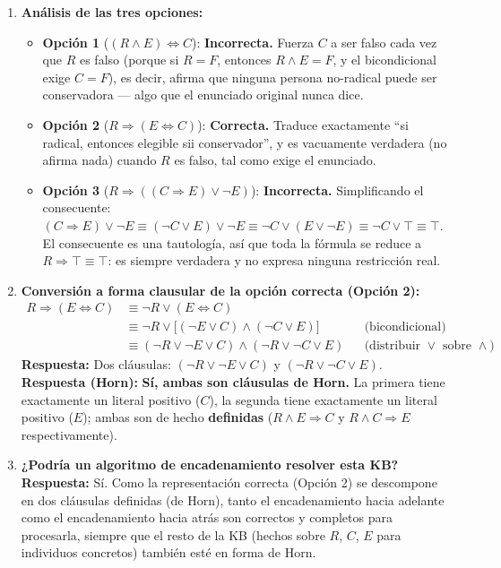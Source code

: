 \begin{enumerate}
    \item \textbf{Análisis de las tres opciones:}
    \begin{itemize}
        \item \textbf{Opción 1} ($(R\land E)\Leftrightarrow C$): \textbf{Incorrecta.} Fuerza
        $C$ a ser falso cada vez que $R$ es falso (porque si $R{=}F$, entonces $R\land E = F$, y el
        bicondicional exige $C=F$), es decir, afirma que ninguna persona no-radical puede ser
        conservadora — algo que el enunciado original nunca dice.
        \item \textbf{Opción 2} ($R\Rightarrow(E\Leftrightarrow C)$): \textbf{Correcta.} Traduce
        exactamente ``si radical, entonces elegible sii conservador'', y es vacuamente verdadera
        (no afirma nada) cuando $R$ es falso, tal como exige el enunciado.
        \item \textbf{Opción 3} ($R\Rightarrow((C\Rightarrow E)\lor \neg E)$): \textbf{Incorrecta.}
        Simplificando el consecuente: $(C\Rightarrow E)\lor\neg E \equiv (\neg C \lor E)\lor \neg E
        \equiv \neg C \lor (E \lor \neg E) \equiv \neg C \lor \top \equiv \top$. El consecuente es
        una tautología, así que toda la fórmula se reduce a $R\Rightarrow\top \equiv \top$: es
        siempre verdadera y no expresa ninguna restricción real.
    \end{itemize}

    \item \textbf{Conversión a forma clausular de la opción correcta (Opción 2):}
    \begin{align*}
        R\Rightarrow(E\Leftrightarrow C) &\equiv \neg R \lor (E\Leftrightarrow C) \\
        &\equiv \neg R \lor \big[(\neg E\lor C)\land(\neg C\lor E)\big] &&\text{(bicondicional)}\\
        &\equiv (\neg R\lor\neg E\lor C) \land (\neg R\lor\neg C\lor E) &&\text{(distribuir }\lor\text{ sobre }\land\text{)}
    \end{align*}
    \textbf{Respuesta:} Dos cláusulas: $(\neg R\lor\neg E\lor C)$ y $(\neg R\lor\neg C\lor E)$.\\
    \textbf{Respuesta (Horn):} \textbf{Sí, ambas son cláusulas de Horn.} La primera tiene exactamente
    un literal positivo ($C$), la segunda tiene exactamente un literal positivo ($E$); ambas son de
    hecho \textbf{definidas} ($R\land E \Rightarrow C$ y $R\land C \Rightarrow E$
    respectivamente).

    \item \textbf{¿Podría un algoritmo de encadenamiento resolver esta KB?}\\
    \textbf{Respuesta:} Sí. Como la representación correcta (Opción 2) se descompone en dos
    cláusulas definidas (de Horn), tanto el encadenamiento hacia adelante como el encadenamiento
    hacia atrás son correctos y completos para procesarla, siempre que el resto de la KB (hechos
    sobre $R$, $C$, $E$ para individuos concretos) también esté en forma de Horn.
\end{enumerate}

